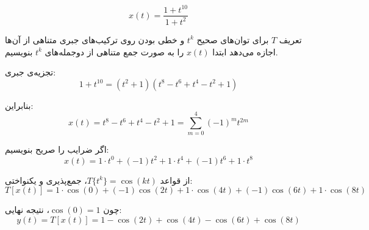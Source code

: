 \[
x(t)=\frac{1+t^{10}}{1+t^2}
\]

تعریف \(T\) برای توان‌های صحیح \(t^k\) و خطی بودن روی ترکیب‌های جبری متناهی از آن‌ها اجازه می‌دهد ابتدا \(x(t)\) را به صورت جمع متناهی از دوجمله‌های \(t^k\) بنویسیم.

تجزیه‌ی جبری:
\[
1+t^{10}=(t^2+1)(t^8-t^6+t^4-t^2+1)
\]

بنابراین:
\[
x(t)=t^8-t^6+t^4-t^2+1
=\sum_{m=0}^{4}(-1)^m t^{2m}
\]

اگر ضرایب را صریح بنویسیم:
\[
x(t)=1\cdot t^0+(-1)t^2+1\cdot t^4+(-1)t^6+1\cdot t^8
\]

از قواعد \(T\{t^k\}=\cos(kt)\)، جمع‌پذیری و یکنواختی:
\[
T[x(t)]
=1\cdot\cos(0)+(-1)\cos(2t)+1\cdot\cos(4t)+(-1)\cos(6t)+1\cdot\cos(8t)
\]

چون \(\cos(0)=1\)، نتیجه نهایی:
\[
\boxed{
y(t)=T[x(t)]=1-\cos(2t)+\cos(4t)-\cos(6t)+\cos(8t)
}
\]
